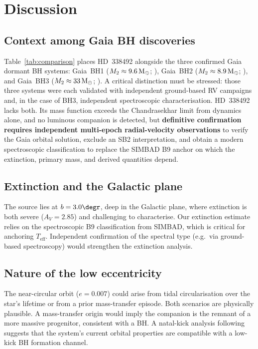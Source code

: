 \documentclass[usenatbib,fleqn]{mnras}
\newcommand{\Msun}{{\rm M}_\odot}
\begin{document}
\section{Discussion}
\label{sec:discussion}

\subsection{Context among Gaia BH discoveries}

Table~\ref{tab:comparison} places HD~338492 alongside the three
confirmed Gaia dormant BH systems: Gaia~BH1
($M_2 \approx 9.6\,\Msun$; \citealt{ElBadry2023a}), Gaia~BH2
($M_2 \approx 8.9\,\Msun$; \citealt{ElBadry2023b}), and Gaia~BH3
($M_2 \approx 33\,\Msun$; \citealt{GaiaBH3_2024}).  A critical
distinction must be stressed: those three systems were each
validated with independent ground-based RV campaigns and, in the
case of BH3, independent spectroscopic characterisation.  HD~338492
lacks both.  Its mass function exceeds the Chandrasekhar limit from
dynamics alone, and no luminous companion is detected, but
\textbf{definitive confirmation requires independent multi-epoch
radial-velocity observations} to verify the Gaia orbital solution,
exclude an SB2 interpretation, and obtain a modern spectroscopic
classification to replace the SIMBAD B9 anchor on which the
extinction, primary mass, and derived quantities depend.

\subsection{Extinction and the Galactic plane}

The source lies at $b = 3.0\degr$, deep in the Galactic plane,
where extinction is both severe ($A_V = 2.85$) and challenging
to characterise.  Our extinction estimate relies on the spectroscopic
B9 classification from SIMBAD, which is critical for anchoring
$T_\mathrm{eff}$.  Independent confirmation of the spectral type
(e.g.\ via ground-based spectroscopy) would strengthen the
extinction analysis.

\subsection{Nature of the low eccentricity}

The near-circular orbit ($e = 0.007$) could arise from tidal
circularisation over the star's lifetime or from a prior
mass-transfer episode.  Both scenarios are physically plausible.
A mass-transfer origin would imply the companion is the remnant of a
more massive progenitor, consistent with a BH.  A natal-kick
analysis following \citet{Brandt1995} suggests that the system's
current orbital properties are compatible with a low-kick BH
formation channel.
\end{document}

